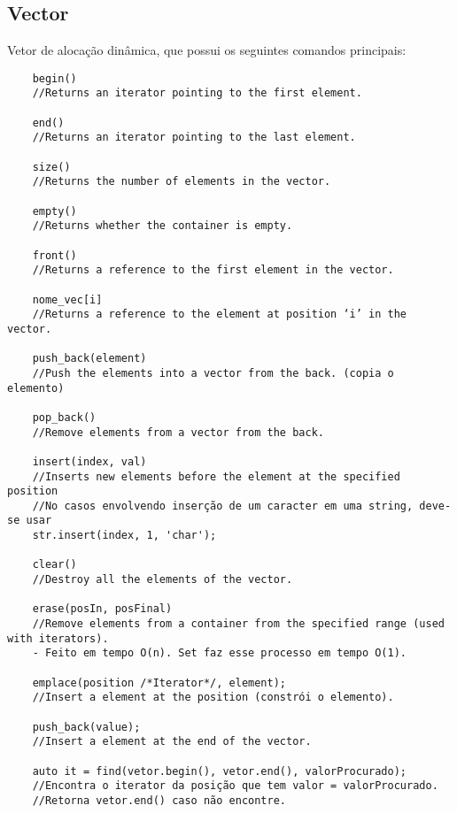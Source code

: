 \subsection{Vector}
Vetor de alocação dinâmica, que possui os seguintes comandos principais:
\begin{verbatim}
    begin()
    //Returns an iterator pointing to the first element.

    end() 
    //Returns an iterator pointing to the last element.

    size() 
    //Returns the number of elements in the vector.

    empty() 
    //Returns whether the container is empty.

    front() 
    //Returns a reference to the first element in the vector.

    nome_vec[i] 
    //Returns a reference to the element at position ‘i’ in the vector.

    push_back(element) 
    //Push the elements into a vector from the back. (copia o elemento)

    pop_back() 
    //Remove elements from a vector from the back.

    insert(index, val) 
    //Inserts new elements before the element at the specified position
    //No casos envolvendo inserção de um caracter em uma string, deve-se usar 
    str.insert(index, 1, 'char');

    clear() 
    //Destroy all the elements of the vector.

    erase(posIn, posFinal) 
    //Remove elements from a container from the specified range (used with iterators).
    - Feito em tempo O(n). Set faz esse processo em tempo O(1).

    emplace(position /*Iterator*/, element); 
    //Insert a element at the position (constrói o elemento).

    push_back(value); 
    //Insert a element at the end of the vector.

    auto it = find(vetor.begin(), vetor.end(), valorProcurado);
    //Encontra o iterator da posição que tem valor = valorProcurado.
    //Retorna vetor.end() caso não encontre.
\end{verbatim}



